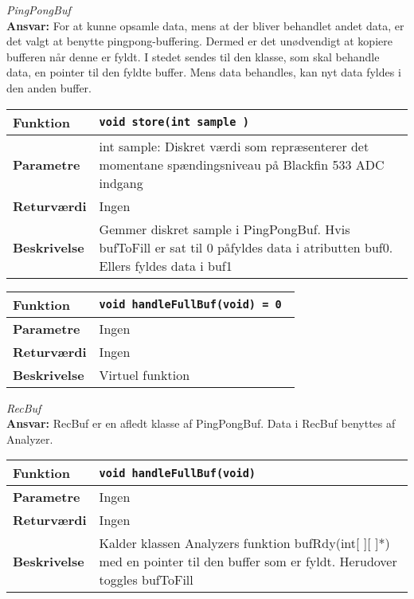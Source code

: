\textit{PingPongBuf} \\
\textbf{Ansvar:} For at kunne opsamle data, mens at der bliver behandlet andet data, er det valgt at benytte pingpong-buffering. Dermed er det unødvendigt at kopiere bufferen når denne er fyldt. I stedet sendes til den klasse, som skal behandle data, en pointer til den fyldte buffer. Mens data behandles, kan nyt data fyldes i den anden buffer.

\begin{center}
    \begin{tabular}{ | l | p{} |}
    \hline
    \textbf{Funktion}	& \verb+void store(int sample ) +						\\ \hline
    \textbf{Parametre} 	& int sample: Diskret værdi som repræsenterer det momentane spændingsniveau på Blackfin 533 ADC indgang		\\ \hline
    \textbf{Returværdi}	& Ingen 								\\ \hline
    \textbf{Beskrivelse}& Gemmer diskret sample i PingPongBuf. Hvis bufToFill er sat til 0 påfyldes data i atributten buf0. Ellers fyldes data i buf1		\\ \hline
    \end{tabular}
\end{center} 

\begin{center}
    \begin{tabular}{ | l | p{} |}
    \hline
    \textbf{Funktion}	& \verb+void handleFullBuf(void) = 0 +						\\ \hline
    \textbf{Parametre} 	& Ingen		\\ \hline
    \textbf{Returværdi}	& Ingen 								\\ \hline
    \textbf{Beskrivelse}& Virtuel funktion		\\ \hline
    \end{tabular}
\end{center} 



\textit{RecBuf} \\
\textbf{Ansvar:} RecBuf er en afledt klasse af PingPongBuf. Data i RecBuf benyttes af Analyzer.

\begin{center}
    \begin{tabular}{ | l | p{} |}
    \hline
    \textbf{Funktion}	& \verb+void handleFullBuf(void) +						\\ \hline
    \textbf{Parametre} 	& Ingen		\\ \hline
    \textbf{Returværdi}	& Ingen 								\\ \hline
    \textbf{Beskrivelse}& Kalder klassen Analyzers funktion bufRdy(int[ ][ ]*) med en pointer til den buffer som er fyldt. Herudover toggles bufToFill		\\ \hline
    \end{tabular}
\end{center} 


